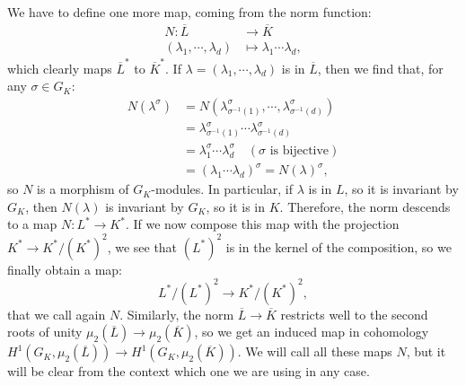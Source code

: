 \documentclass[a4paper, 12pt]{amsart}
\theoremstyle{definition}
\theoremstyle{plain}
\theoremstyle{plain}
\theoremstyle{plain}
\theoremstyle{plain}
\theoremstyle{remark}
\theoremstyle{remark}
\theoremstyle{plain}
\begin{document}
	We have to define one more map, coming from the norm function:
	\begin{align*}
		N:\overline{L}&\rightarrow\overline{K}\\
		(\lambda_1,\cdots,\lambda_d)&\mapsto \lambda_1\cdots\lambda_d,
	\end{align*}
	which clearly maps $\overline{L}^*$ to $\overline{K}^*$. If $\lambda=(\lambda_1,\cdots,\lambda_d)$ is in $\overline{L}$, then we find that, for any $\sigma\in G_K$:
	\begin{align*}
		N(\lambda^\sigma)&=N(\lambda_{\sigma^{-1}(1)}^\sigma,\cdots,\lambda_{\sigma^{-1}(d)}^\sigma)\\
		&=\lambda_{\sigma^{-1}(1)}^\sigma\cdots\lambda_{\sigma^{-1}(d)}^\sigma\\
		&=\lambda_1^\sigma\cdots\lambda_d^\sigma\quad(\sigma\text{ is bijective})\\
		&=(\lambda_1\cdots\lambda_d)^\sigma=N(\lambda)^\sigma,
	\end{align*}
	so $N$ is a morphism of $G_K$-modules. In particular, if $\lambda$ is in $L$, so it is invariant by $G_K$, then $N(\lambda)$ is invariant by $G_K$, so it is in $K$. Therefore, the norm descends to a map $N:L^*\rightarrow K^*$. If we now compose this map with the projection $K^*\rightarrow K^*/(K^*)^2$, we see that $(L^*)^2$ is in the kernel of the composition, so we finally obtain a map:
	\begin{equation*}
		L^*/(L^*)^2\rightarrow K^*/(K^*)^2,
	\end{equation*}
	that we call again $N$. Similarly, the norm $\overline{L}\rightarrow \overline{K}$ restricts well to the second roots of unity $\mu_2(\overline{L})\rightarrow\mu_2(\overline{K})$, so we get an induced map in cohomology $H^1(G_K,\mu_2(\overline{L}))\rightarrow H^1(G_K,\mu_2(\overline{K}))$. We will call all these maps $N$, but it will be clear from the context which one we are using in any case.
	
\end{document}
